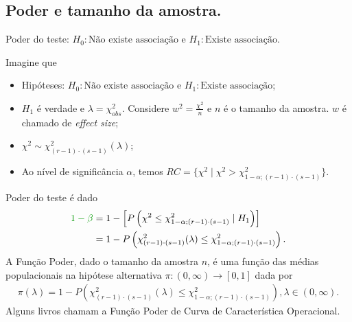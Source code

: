 \documentclass[9pt]{beamer}
\begin{document}
\subsection{Poder e tamanho da amostra.}

\begin{frame}{Poder do teste: $H_0:\mbox{Não existe associação}$ e $H_1:\mbox{Existe associação} $.}

\normalsize

Imagine que
\begin{itemize}
	\item Hipóteses: $H_0:\mbox{Não existe associação}$ e $H_1:\mbox{Existe associação} $;
	\item $H_1$ é verdade e $\lambda = \chi^2_{obs}$. Considere $w^2 = \frac{\chi^2}{n}$ e $n$ é o tamanho da amostra. $w$ é chamado de \textit{effect size};
	\item $\chi^2  \sim \chi^2_{(r-1)\cdot (s-1)}\left( \lambda \right)$;
	\item Ao nível de significância $\alpha$, temos $RC = \{ \chi^2 \mid \chi^2 > \chi^2_{1-\alpha; (r-1) \cdot (s-1)}  \}$.
\end{itemize}
\vfill	

Poder do teste é dado
\begin{align*}
\textcolor{important}{1-\beta} &=1 - \left[P\left(  \chi^2 \leq \chi_{1-\alpha; (r-1)\cdot (s-1)}^2 \mid H_1 \right)\right]\\
&= 1 - P\left( \chi_{(r-1)\cdot (s-1)}^2(\lambda) \leq \chi_{1-\alpha; (r-1)\cdot (s-1)}^2 \right).
\end{align*}
A \textcolor{important}{Função Poder}, dado o tamanho da amostra $n$, é uma função das médias populacionais na hipótese alternativa  $\pi: (0, \infty) \longrightarrow [0,1]$ dada por
\begin{align*}
\pi(\lambda) = 1 - P\left( \chi_{(r-1)\cdot (s-1)}^2(\lambda) \leq \chi_{1-\alpha; (r-1)\cdot (s-1)}^2 \right), \lambda \in (0, \infty).
\end{align*}
Alguns livros chamam a Função Poder de \textcolor{important}{Curva de Característica Operacional.}

\normalsize

\end{frame}
\end{document}
